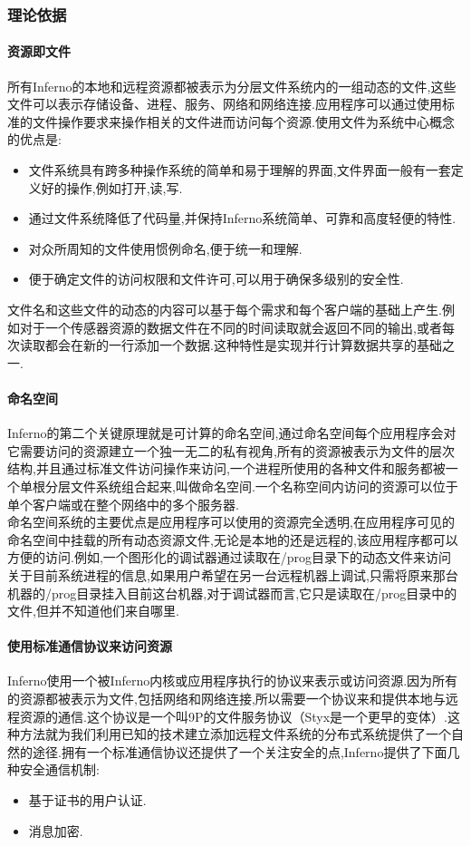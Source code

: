 \documentclass[paper=a4]{ctexart} %
\numberwithin{equation}{section} %
\numberwithin{figure}{section} %
\numberwithin{table}{section} %
\newcommand{\n}{\\\indent}
\begin{document}
\subsubsection{理论依据}

\paragraph{资源即文件}

所有Inferno的本地和远程资源都被表示为分层文件系统内的一组动态的文件,这些文件可以表示存储设备、进程、服务、网络和网络连接.应用程序可以通过使用标准的文件操作要求来操作相关的文件进而访问每个资源.使用文件为系统中心概念的优点是:
\begin{itemize}
\item 文件系统具有跨多种操作系统的简单和易于理解的界面,文件界面一般有一套定义好的操作,例如打开,读,写.
\item 通过文件系统降低了代码量,并保持Inferno系统简单、可靠和高度轻便的特性.
\item 对众所周知的文件使用惯例命名,便于统一和理解.
\item 便于确定文件的访问权限和文件许可,可以用于确保多级别的安全性.
\end{itemize}
\hspace{0.75cm}文件名和这些文件的动态的内容可以基于每个需求和每个客户端的基础上产生.例如对于一个传感器资源的数据文件在不同的时间读取就会返回不同的输出,或者每次读取都会在新的一行添加一个数据.这种特性是实现并行计算数据共享的基础之一.

\paragraph{命名空间}
 Inferno的第二个关键原理就是可计算的命名空间,通过命名空间每个应用程序会对它需要访问的资源建立一个独一无二的私有视角,所有的资源被表示为文件的层次结构,并且通过标准文件访问操作来访问,一个进程所使用的各种文件和服务都被一个单根分层文件系统组合起来,叫做命名空间.一个名称空间内访问的资源可以位于单个客户端或在整个网络中的多个服务器.\n
    命名空间系统的主要优点是应用程序可以使用的资源完全透明,在应用程序可见的命名空间中挂载的所有动态资源文件,无论是本地的还是远程的,该应用程序都可以方便的访问.例如,一个图形化的调试器通过读取在/prog目录下的动态文件来访问关于目前系统进程的信息,如果用户希望在另一台远程机器上调试,只需将原来那台机器的/prog目录挂入目前这台机器,对于调试器而言,它只是读取在/prog目录中的文件,但并不知道他们来自哪里.

\paragraph{使用标准通信协议来访问资源}
  Inferno使用一个被Inferno内核或应用程序执行的协议来表示或访问资源.因为所有的资源都被表示为文件,包括网络和网络连接,所以需要一个协议来和提供本地与远程资源的通信.这个协议是一个叫9P的文件服务协议（Styx是一个更早的变体）.这种方法就为我们利用已知的技术建立添加远程文件系统的分布式系统提供了一个自然的途径.拥有一个标准通信协议还提供了一个关注安全的点,Inferno提供了下面几种安全通信机制:
  \begin{itemize}
  \item 基于证书的用户认证.
  \item 消息加密.
  \end{itemize}
\end{document}
